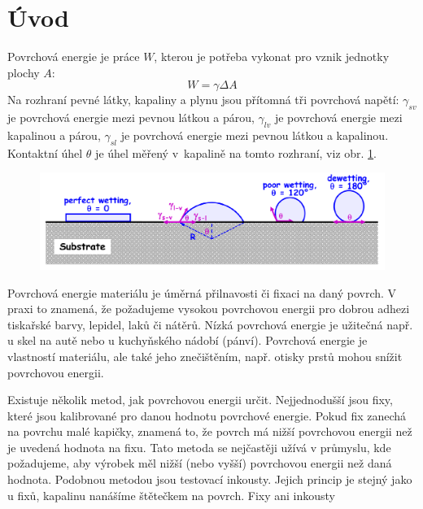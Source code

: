 \documentclass{protokol}
\begin{document}
\header
\section{Úvod}
\par Povrchová energie je práce $W$, kterou je potřeba vykonat pro vznik 
jednotky plochy $A$:
\begin{equation}
	W = \gamma\Delta A
\end{equation}
Na rozhraní pevné látky, kapaliny a plynu jsou přítomná tři povrchová napětí: 
$\gamma_{sv}$ je povrchová energie mezi pevnou látkou a párou, $\gamma_{lv}$ je 
povrchová energie mezi kapalinou a párou, $\gamma_{sl}$ je povrchová energie 
mezi pevnou látkou a kapalinou. Kontaktní úhel $\theta$ je úhel měřený 
v~kapalině na tomto rozhraní, viz obr. \ref{wetting}. 
\begin{figure}[b]
	\begin{center}
		\includegraphics[width=\textwidth]{wetting.png}
		\label{wetting}
	\end{center} 
\end{figure}
\par Povrchová energie materiálu je úměrná přilnavosti či fixaci na daný 
povrch. V praxi to znamená, že požadujeme vysokou povrchovou energii pro dobrou 
adhezi tiskařské barvy, lepidel, laků či nátěrů. Nízká povrchová energie je 
užitečná např. u skel na autě nebo u kuchyňského nádobí (pánví). Povrchová 
energie je vlastností materiálu, ale také jeho znečištěním, 
např. otisky prstů mohou snížit povrchovou energii.
\par Existuje několik metod, jak povrchovou energii určit. Nejjednodušší jsou 
fixy, které jsou kalibrované pro danou hodnotu povrchové energie. Pokud fix 
zanechá na povrchu malé kapičky, znamená to, že povrch má nižší povrchovou 
energii než je uvedená hodnota na fixu. Tato metoda se nejčastěji užívá v 
průmyslu, kde požadujeme, aby výrobek měl nižší (nebo vyšší) povrchovou energii 
než daná hodnota. Podobnou metodou jsou testovací inkousty. Jejich princip je 
stejný jako u fixů, kapalinu nanášíme štětečkem na povrch. Fixy ani inkousty 
\end{document}
